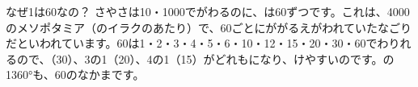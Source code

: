 \begin{column}{なぜ1は60なの？}
さやさは10・1000でがわるのに、は60ずつです。これは、4000のメソポタミア（のイラクのあたり）で、60ごとにががるえがわれていたなごりだといわれています。60は1・2・3・4・5・6・10・12・15・20・30・60でわりれるので、（30）、3の1（20）、4の1（15）がどれもになり、けやすいのです。の1360°も、60のなかまです。
\end{column}

